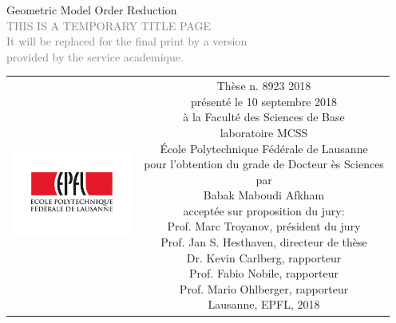 \begin{titlepage}
\begin{center}
\sffamily


\null\vspace{2cm}
{\huge Geometric Model Order Reduction} \\[24pt] 
\textcolor{gray}{\small{THIS IS A TEMPORARY TITLE PAGE \\ It will be replaced for the final print by a version \\ provided by the service academique.}}
    
\vfill

\begin{tabular} {cc}
\parbox{0.3\textwidth}{\includegraphics[width=4cm]{images/epfl}}
&
\parbox{0.7\textwidth}{%
	Thèse n. 8923 2018\\
	présenté le 10 septembre 2018\\
	à la Faculté des Sciences de Base\\
	laboratoire MCSS\\
%
	École Polytechnique Fédérale de Lausanne\\[6pt]
	pour l'obtention du grade de Docteur ès Sciences\\
	par\\ [4pt]
	\null \hspace{3em} Babak Maboudi Afkham\\[9pt]
%
\small
acceptée sur proposition du jury:\\[4pt]
%
    Prof. Marc Troyanov, président du jury\\
    Prof. Jan S. Hesthaven, directeur de thèse\\
	Dr. Kevin Carlberg, rapporteur\\
    Prof. Fabio Nobile, rapporteur\\
    Prof. Mario Ohlberger, rapporteur\\[12pt]
    
%
Lausanne, EPFL, 2018}
\end{tabular}
\end{center}
\vspace{2cm}
\end{titlepage}



